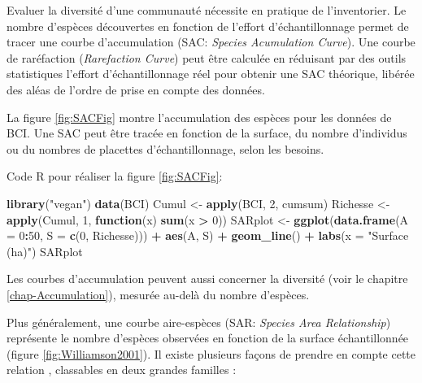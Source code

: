 \documentclass[
  11pt,
  french,
  a4paper,
  extrafontsizes,onecolumn,openright
  ]{memoir}
\newenvironment{Shaded}{\begin{snugshade}}{\end{snugshade}}
\newcommand{\AttributeTok}[1]{\textcolor[rgb]{0.13,0.29,0.53}{#1}}
\newcommand{\ControlFlowTok}[1]{\textcolor[rgb]{0.13,0.29,0.53}{\textbf{#1}}}
\newcommand{\DecValTok}[1]{\textcolor[rgb]{0.00,0.00,0.81}{#1}}
\newcommand{\FunctionTok}[1]{\textcolor[rgb]{0.13,0.29,0.53}{\textbf{#1}}}
\newcommand{\NormalTok}[1]{#1}
\newcommand{\OtherTok}[1]{\textcolor[rgb]{0.56,0.35,0.01}{#1}}
\newcommand{\SpecialCharTok}[1]{\textcolor[rgb]{0.81,0.36,0.00}{\textbf{#1}}}
\newcommand{\StringTok}[1]{\textcolor[rgb]{0.31,0.60,0.02}{#1}}
\newlength{\rf}
\begin{document}
\normalsize

Evaluer la diversité d'une communauté nécessite en pratique de l'inventorier.
Le nombre d'espèces découvertes en fonction de l'effort d'échantillonnage permet de tracer une courbe d'accumulation (SAC: \emph{Species Acumulation Curve}).
Une courbe de raréfaction (\emph{Rarefaction Curve}) peut être calculée en réduisant par des outils statistiques l'effort d'échantillonnage réel pour obtenir une SAC théorique, libérée des aléas de l'ordre de prise en compte des données.

La figure \ref{fig:SACFig} montre l'accumulation des espèces pour les données de BCI.
Une SAC peut être tracée en fonction de la surface, du nombre d'individus ou du nombres de placettes d'échantillonnage, selon les besoins.

Code R pour réaliser la figure \ref{fig:SACFig}:

\scriptsize

\begin{Shaded}
\begin{Highlighting}[]
\FunctionTok{library}\NormalTok{(}\StringTok{"vegan"}\NormalTok{)}
\FunctionTok{data}\NormalTok{(BCI)}
\NormalTok{Cumul }\OtherTok{\textless{}{-}} \FunctionTok{apply}\NormalTok{(BCI, }\DecValTok{2}\NormalTok{, cumsum)}
\NormalTok{Richesse }\OtherTok{\textless{}{-}} \FunctionTok{apply}\NormalTok{(Cumul, }\DecValTok{1}\NormalTok{, }\ControlFlowTok{function}\NormalTok{(x) }\FunctionTok{sum}\NormalTok{(x }\SpecialCharTok{\textgreater{}} \DecValTok{0}\NormalTok{))}
\NormalTok{SARplot }\OtherTok{\textless{}{-}} \FunctionTok{ggplot}\NormalTok{(}\FunctionTok{data.frame}\NormalTok{(}\AttributeTok{A =} \DecValTok{0}\SpecialCharTok{:}\DecValTok{50}\NormalTok{, }
                             \AttributeTok{S =} \FunctionTok{c}\NormalTok{(}\DecValTok{0}\NormalTok{, Richesse))) }\SpecialCharTok{+}
  \FunctionTok{aes}\NormalTok{(A, S) }\SpecialCharTok{+}
  \FunctionTok{geom\_line}\NormalTok{() }\SpecialCharTok{+}
  \FunctionTok{labs}\NormalTok{(}\AttributeTok{x =} \StringTok{"Surface (ha)"}\NormalTok{)}
\NormalTok{SARplot}
\end{Highlighting}
\end{Shaded}

\normalsize

Les courbes d'accumulation peuvent aussi concerner la diversité (voir le chapitre \ref{chap-Accumulation}), mesurée au-delà du nombre d'espèces.

Plus généralement, une courbe aire-espèces (SAR: \emph{Species Area Relationship}) représente le nombre d'espèces observées en fonction de la surface échantillonnée (figure \ref{fig:Williamson2001}).
Il existe plusieurs façons de prendre en compte cette relation \autocite{Scheiner2003}, classables en deux grandes familles \autocite{Dengler2009}:
\end{document}
